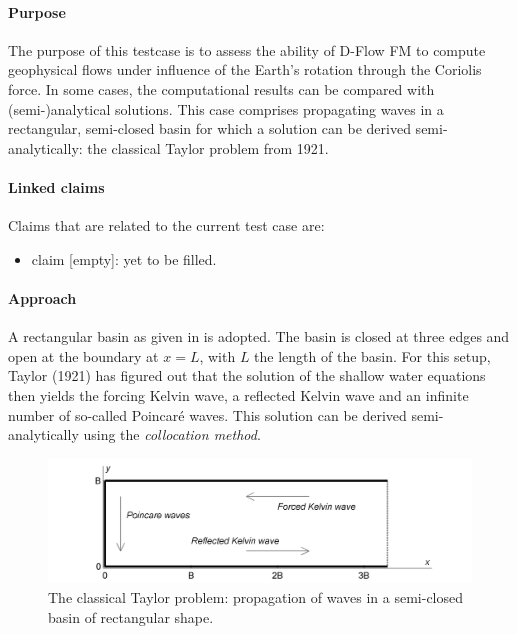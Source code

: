 \label{case:corioliswithfriction}

\paragraph*{Purpose}
The purpose of this testcase is to assess the ability of D-Flow FM to compute geophysical flows under influence of the Earth's rotation through the Coriolis force. In some cases, the computational results can be compared with (semi-)analytical solutions. This case comprises propagating waves in a rectangular, semi-closed basin for which a solution can be derived semi-analytically: the classical Taylor problem from 1921.

\paragraph*{Linked claims}
Claims that are related to the current test case are:
\begin{itemize}
\item claim [empty]: yet to be filled.
\end{itemize}

\paragraph*{Approach}
A rectangular basin as given in  is adopted. The basin is closed at three edges and open at the boundary at $x = L$, with $L$ the length of the basin. For this setup, Taylor (1921) has figured out that the solution of the shallow water equations then yields the forcing Kelvin wave, a reflected Kelvin wave and an infinite number of so-called Poincar\'e waves. This solution can be derived semi-analytically using the \emph{collocation method}.

\begin{figure}[h!]
\begin{center}
\includegraphics[width=1.0\columnwidth]{figures/wavesinbasin.png}
\end{center}\caption{The classical Taylor problem: propagation of waves in a semi-closed basin of rectangular shape. \label{fig:wavesinbasinfricyes}}
\end{figure}

